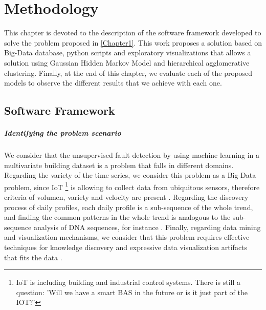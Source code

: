\chapter{Methodology} %
\label{Chapter4} %
\minitoc


This chapter is devoted to the description of the software framework developed to solve the problem proposed in \ref{Chapter1}. This work proposes a solution based on Big-Data database, python scripts and exploratory visualizations that allows a solution using Gaussian Hidden Markov Model and hierarchical agglomerative clustering. Finally, at the end of this chapter, we evaluate each of the proposed models to observe the different results that we achieve with each one.

\section{Software Framework}

\paragraph{Identifying the problem scenario}
We consider that the unsupervised fault detection by using machine learning in a multivariate building dataset is a problem that falls in different domains. Regarding the variety of the time series, we consider this problem as a Big-Data problem, since IoT \footnote{IoT is including building and industrial control systems. There is still a question: 'Will we have a smart BAS in the future or is it just part of the IOT?'} is allowing to collect data from ubiquitous sensors, therefore criteria of volumen, variety and velocity are present \cite{george2014big,gubbi2013internet}. Regarding the discovery process of daily profiles, each daily profile is a sub-sequence of the whole trend, and finding the common patterns in the whole trend is analogous to the sub-sequence analysis of DNA sequences, for instance \cite{haussler1996generalized, ghahramani2001introduction, stamp2004revealing, ramage2007hidden, pfundstein2011hidden}. Finally, regarding data mining and visualization mechanisms, we consider that this problem requires effective techniques for knowledge discovery and expressive data visualization artifacts that fits the data \cite{witten2016data,aparicio2014, kohavi2001data}.   

